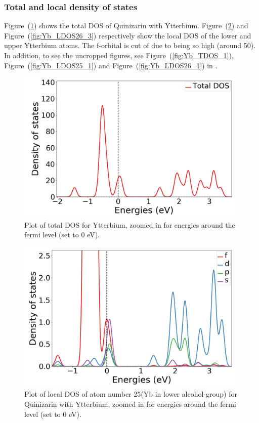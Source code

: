 \documentclass{article}
\begin{document}
      \vspace{1cm}

    \subsubsection{Total and local density of states}

      Figure~(\ref{fig:Yb_TDOS_2}) shows the total DOS of Quinizarin with Ytterbium. Figure~(\ref{fig:Yb_LDOS25_3}) and Figure~(\ref{fig:Yb_LDOS26_3}) respectively show the local DOS of the lower and upper Ytterbium atoms. The f-orbital is cut of due to being so high (around 50).
      In addition, to see the uncropped figures, see Figure~(\ref{fig:Yb_TDOS_1}), Figure~(\ref{fig:Yb_LDOS25_1}) and Figure~(\ref{fig:Yb_LDOS26_1}) in .\\

      \begin{figure}[H]
        \centering
        \includegraphics[width = 11cm]{../fig/Yb_TDOS_2.png}
        \caption{Plot of total DOS for Ytterbium, zoomed in for energies around the fermi level (set to 0 eV). }
        \label{fig:Yb_TDOS_2}
      \end{figure}

      \begin{figure}[H]
          \centering
          \includegraphics[width = 11cm]{../fig/Yb_LDOS25_3.png}
          \caption{Plot of local DOS of atom number 25(Yb in lower alcohol-group) for Quinizarin with Ytterbium, zoomed in for energies around the fermi level (set to 0 eV). }
          \label{fig:Yb_LDOS25_3}
      \end{figure}
\end{document}

